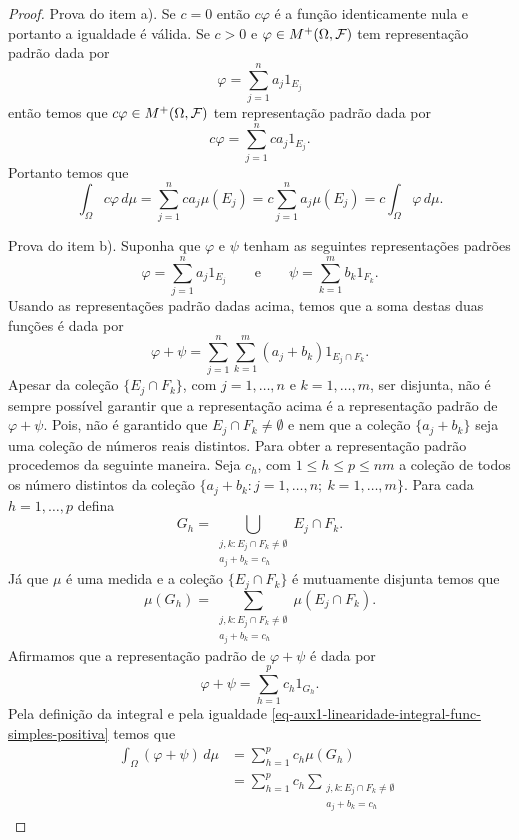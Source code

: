 \begin{proof}
Prova do item a). Se $c=0$ então $c\varphi$ é a função 
identicamente nula e portanto a igualdade é válida. 
Se $c>0$ e $\varphi\in M^{+}(\Omega,\mathcal{F})$ tem 
representação padrão dada por
	\[
		\varphi  
		=
		\sum_{j=1}^n a_j 1_{E_j} 
	\]
então temos que $c\varphi\in M^{+}(\Omega,\mathcal{F})$ tem 
representação padrão dada por 
	\[
		c\varphi  
		=
		\sum_{j=1}^n ca_j 1_{E_j}. 
	\]
Portanto temos que 
	\[
	\int_{\Omega} c\varphi\, d\mu
	=
	\sum_{j=1}^n ca_{j} \mu(E_j)
	=
	c \sum_{j=1}^n a_{j} \mu(E_j)
	=
	c \int_{\Omega} \varphi\, d\mu.
	\]



Prova do item b). Suponha que $\varphi$ e $\psi$ tenham as 
seguintes representações padrões
	\[
		\varphi  
		=
		\sum_{j=1}^n a_j 1_{E_j} 
		\qquad
		\text{e}
		\qquad
		\psi 
		=
		\sum_{k=1}^m b_k 1_{F_k}.
	\]
Usando as representações padrão dadas acima,
temos que a soma destas duas funções é dada por
	\[
		\varphi+\psi
		=
		\sum_{j=1}^n\sum_{k=1}^m (a_j+b_k) 1_{E_j\cap F_k}.
	\]
Apesar da coleção $\{E_j\cap F_k\}$, com $j=1,\ldots,n$ e $k=1,\ldots,m$, 
ser disjunta, não é sempre possível garantir que a representação
acima é a representação padrão de $\varphi+\psi$.
Pois, não é garantido que $E_j\cap F_k\neq \emptyset$ 
e nem que a coleção $\{a_j+b_k\}$ seja uma coleção de
números reais distintos. Para obter a representação 
padrão procedemos da seguinte maneira. 
Seja $c_h$, com $1\leq h\leq p\leq nm$ a coleção 
de todos os número distintos da coleção 
$\{ a_j+b_k: j=1,\ldots,n;\ k=1,\ldots,m\}$. 
Para cada $h=1,\ldots, p$ defina 
	\[
		G_h
		=
		\bigcup_{ \substack {j,k : E_j\cap F_k\neq \emptyset \\a_j+b_k=c_h}  }
		E_j\cap F_k.
	\] 
Já que $\mu$ é uma medida e a coleção $\{E_j\cap F_k\}$ é mutuamente disjunta
temos que
	\begin{equation}\label{eq-aux1-linearidade-integral-func-simples-positiva}
		\mu(G_h)
		=
		\sum_{ \substack {j,k : E_j\cap F_k\neq \emptyset \\a_j+b_k=c_h}  }
		\mu(E_j\cap F_k).
	\end{equation} 
Afirmamos que a representação padrão de $\varphi+\psi$ é dada por 
	\[
		\varphi+\psi = \sum_{h=1}^p c_h 1_{G_h}.
	\]
Pela definição da integral e pela igualdade 
\eqref{eq-aux1-linearidade-integral-func-simples-positiva} 
temos que 
\begin{align*}
\int_{\Omega}(\varphi+\psi)\, d\mu 
&= 
\sum_{h=1}^p c_h \mu(G_h)
\\
&=
\sum_{h=1}^p 
	c_h 
	\sum_{ \substack {j,k : E_j\cap F_k\neq \emptyset \\a_j+b_k=c_h}  }

\end{align*}
\end{proof}
